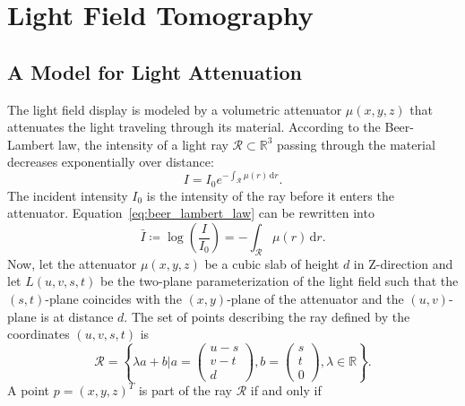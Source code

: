 \chapter{Light Field Tomography}

\section{A Model for Light Attenuation}

The light field display is modeled by a volumetric attenuator $\mu(x, y, z)$ that attenuates the light traveling through its material.
According to the Beer-Lambert law, the intensity of a light ray $\mathcal{R} \subset \mathbb{R}^3$ passing through the material decreases exponentially over distance:
\begin{equation}\label{eq:beer_lambert_law}
I = I_0 e^{-\int_\mathcal{R} \mu(r) \, \mathrm{d}r }.
\end{equation}
The incident intensity $I_0$ is the intensity of the ray before it enters the attenuator.
Equation~\ref{eq:beer_lambert_law} can be rewritten into 
\begin{equation}\label{eq:log_beer_lambert_law}
\bar{I} \coloneqq \log \left( \frac{I}{I_0} \right) = -\int_\mathcal{R} \mu(r) \, \mathrm{d}r.
\end{equation} 
Now, let the attenuator $\mu(x, y, z)$ be a cubic slab of height $d$ in Z-direction and let $L(u, v, s, t)$ be the two-plane parameterization of the light field such that the $(s, t)$-plane coincides with the $(x, y)$-plane of the attenuator and the $(u, v)$-plane is at distance $d$.
The set of points describing the ray defined by the coordinates $(u, v, s, t)$ is
\begin{equation}
\mathcal{R} = \left\{ \lambda a + b 
\mathrel{\bigg|} a = 
\begin{pmatrix}
u - s \\ 
v - t \\ 
d
\end{pmatrix}, 
b = 
\begin{pmatrix}
s \\ 
t \\ 
0
\end{pmatrix},
\lambda \in \mathbb{R} 
\right\}.
\end{equation}
A point $p = (x, y, z)^T$ is part of the ray $\mathcal{R}$ if and only if
